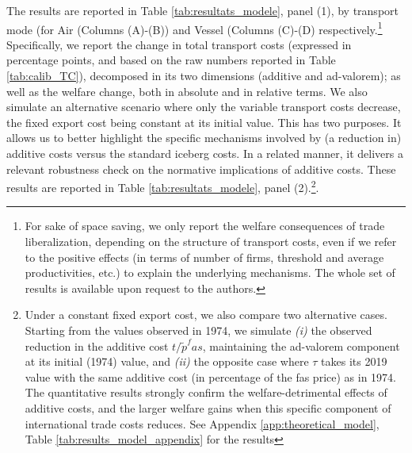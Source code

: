 \documentclass[a4paper,11pt]{article}
\begin{document}
The results are reported in Table \ref{tab:resultats_modele}, panel (1), by transport mode (for Air (Columns (A)-(B)) and Vessel (Columns (C)-(D) respectively.\footnote{For sake of space saving, we only report the welfare consequences of trade liberalization, depending on the structure of transport costs, even if we refer to the positive effects (in terms of number of firms, threshold and average productivities, etc.) to explain the underlying mechanisms. The whole set of results is available upon request to the authors.} Specifically, we report the change in total transport costs (expressed in percentage points, and based on the raw numbers reported in Table \ref{tab:calib_TC}), decomposed in its two dimensions (additive and ad-valorem); as well as the welfare change, both in absolute and in relative terms.
We also simulate an alternative scenario where only the variable transport costs decrease, the fixed export cost being constant at its initial value. This has two purposes. It allows us to better highlight the specific mechanisms involved by (a reduction in) additive costs versus the standard iceberg costs. In a related manner, it delivers a relevant robustness check on the normative implications of additive costs. These results are reported in Table \ref{tab:resultats_modele}, panel (2).\footnote{Under a constant fixed export cost, we also compare two alternative cases. Starting from the values observed in 1974, we simulate \textit{(i)} the observed reduction in the additive cost $t/\widetilde{p}^fas$, maintaining the ad-valorem component at its initial (1974) value, and  \textit{(ii)} the opposite case where $\tau$ takes its 2019 value with the same additive cost (in percentage of the fas price) as in 1974. The quantitative results strongly confirm the welfare-detrimental effects of additive costs, and the larger welfare gains when this specific component of international trade costs reduces. See Appendix \ref{app:theoretical_model}, Table \ref{tab:results_model_appendix} for the results}.
\end{document}
